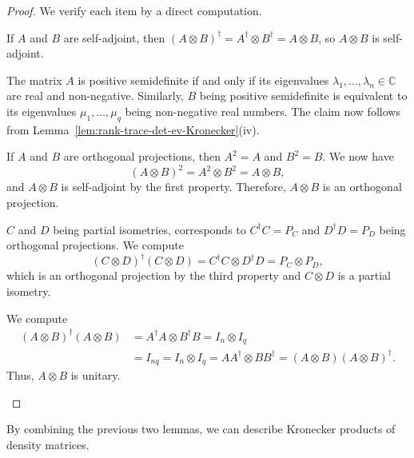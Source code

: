 \documentclass[a4paper, oneside, 12pt]{amsart}
\begin{document}
\begin{proof}
  We verify each item by a direct computation.
\begin{thmlist}
  \item If \( A \) and \( B \) are self-adjoint, then \( (A \otimes B)^\dagger = A^\dagger \otimes B^\dagger = A \otimes B \), so \( A \otimes B \) is self-adjoint.

  \item The matrix \( A \) is  positive semidefinite if and only if its eigenvalues \(\lambda_{1}, \dots , \lambda_{n} \in \mathbb{C}\) are real and non-negative.
  Similarly, \(B\) being positive semidefinite is equivalent to its eigenvalues \(\mu_{1}, \dots , \mu_{q}\) being non-negative real numbers.
  The claim now follows from Lemma~\ref{lem:rank-trace-det-ev-Kronecker}(iv).
  \item If \( A \) and \( B \) are orthogonal projections, then \( A^2 = A \) and \( B^2 = B \).
  We now have
  \begin{equation*}
    (A \otimes B)^2 = A^2 \otimes B^2 = A \otimes B,
  \end{equation*}
  and \( A \otimes B \) is self-adjoint by the first property.
  Therefore, \( A \otimes B \) is an orthogonal projection.
  \item \( C \) and \( D \) being partial isometries, corresponds to  \( C^\dagger C = P_C \) and \( D^\dagger D = P_D \) being orthogonal projections.
  We compute
  \begin{equation*}
    (C \otimes D)^\dagger (C \otimes D) = C^\dagger C \otimes D^\dagger D = P_C \otimes P_D,
  \end{equation*}
  which is an orthogonal projection by the third property and \(C\otimes D\) is a partial isometry.
  \item We compute
  \begin{align*}
    (A \otimes B)^\dagger (A \otimes B)
    & = A^\dagger A \otimes B^\dagger B
      = I_n \otimes I_q\\
    & = I_{nq}
      =  I_n \otimes I_q
      = A A^\dagger \otimes B B^\dagger
      = (A \otimes B)(A \otimes B)^\dagger.
  \end{align*}
  Thus, \( A \otimes B \) is unitary. \qedhere
\end{thmlist}
\end{proof}

By combining the previous two lemmas, we can describe Kronecker products of density matrices.
\end{document}
